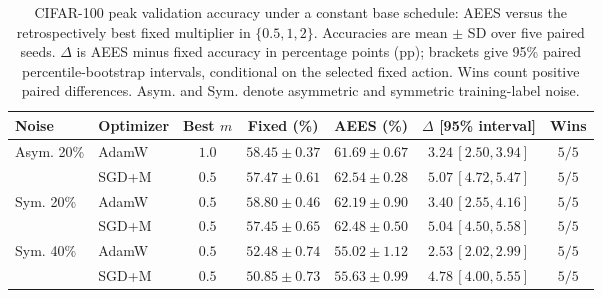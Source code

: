 \begin{table}[!htbp]
\centering
\caption{CIFAR-100 peak validation accuracy under a constant base schedule:
AEES versus the retrospectively best fixed multiplier in \(\{0.5,1,2\}\).
Accuracies are mean \(\pm\) SD over five paired seeds. \(\Delta\) is
AEES minus fixed accuracy in percentage points (pp); brackets give 95\%
paired percentile-bootstrap intervals, conditional on the selected fixed
action. Wins count positive paired differences. Asym. and Sym. denote
asymmetric and symmetric training-label noise.}
\label{tab:cifar-fixed}
\footnotesize
\setlength{\tabcolsep}{2.2pt}
\renewcommand{\arraystretch}{1.08}
\begin{tabular*}{\linewidth}{@{\extracolsep{\fill}}llccccc@{}}
\toprule
Noise & Optimizer & Best \(m\) & Fixed (\%) & AEES (\%) &
\(\Delta\) [95\% interval] & Wins \\
\midrule
\multirow{2}{*}{Asym. 20\%}
& AdamW & \(1.0\) & \(58.45\pm0.37\) & \(61.69\pm0.67\)
& \(3.24\,[2.50,3.94]\) & \(5/5\) \\
& SGD+M & \(0.5\) & \(57.47\pm0.61\) & \(62.54\pm0.28\)
& \(5.07\,[4.72,5.47]\) & \(5/5\) \\
\midrule
\multirow{2}{*}{Sym. 20\%}
& AdamW & \(0.5\) & \(58.80\pm0.46\) & \(62.19\pm0.90\)
& \(3.40\,[2.55,4.16]\) & \(5/5\) \\
& SGD+M & \(0.5\) & \(57.45\pm0.65\) & \(62.48\pm0.50\)
& \(5.04\,[4.50,5.58]\) & \(5/5\) \\
\midrule
\multirow{2}{*}{Sym. 40\%}
& AdamW & \(0.5\) & \(52.48\pm0.74\) & \(55.02\pm1.12\)
& \(2.53\,[2.02,2.99]\) & \(5/5\) \\
& SGD+M & \(0.5\) & \(50.85\pm0.73\) & \(55.63\pm0.99\)
& \(4.78\,[4.00,5.55]\) & \(5/5\) \\
\bottomrule
\end{tabular*}
\end{table}
